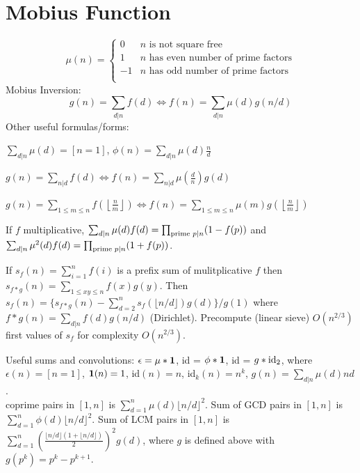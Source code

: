 \section{Mobius Function}
\[
	\mu(n) = \begin{cases} 0 & n \textrm{ is not square free}\\ 1 & n \textrm{ has even number of prime factors}\\ -1 & n \textrm{ has odd number of prime factors}\\\end{cases}
\]
  Mobius Inversion:
  \[ g(n) = \sum_{d|n} f(d) \Leftrightarrow f(n) = \sum_{d|n} \mu(d)g(n/d) \]
  Other useful formulas/forms:

  $ \sum_{d | n} \mu(d) = [ n = 1] $,
  $ \phi(n) = \sum_{d | n} \mu(d)\frac{n}{d}$

  $ g(n) = \sum_{n|d} f(d) \Leftrightarrow f(n) = \sum_{n|d} \mu(\frac{d}{n})g(d)$

  $ g(n) = \sum_{1 \leq m \leq n} f(\left\lfloor\frac{n}{m}\right \rfloor ) \Leftrightarrow f(n) = \sum_{1\leq m\leq n} \mu(m)g(\left\lfloor\frac{n}{m}\right\rfloor)$

  If $f$ multiplicative, $\sum_{d | n} \mu(d)f(d) = \prod_{\textnormal{prime } p | n}(1 - f(p))$ and $\sum_{d | n}\mu^2(d)f(d) = \prod_{\textnormal{prime } p | n} (1 + f(p))$. 

  If $s_f(n) = \sum_{i = 1}^{n} f(i)$ is a prefix sum of mulitplicative $f$ then $s_{f * g}(n) = \sum_{1 \leq xy \leq n}f(x)g(y)$. Then $s_f(n) = \{s_{f * g}(n) - \sum_{d = 2}^{n} s_f(\lfloor n / d \rfloor) g(d)\} / g(1)$ where $f * g(n) = \sum_{d | n} f(d)g(n / d)$ (Dirichlet). Precompute (linear sieve) $O(n^{2/3})$ first values of $s_f$ for complexity $O(n^{2/3})$.

  Useful sums and convolutions: $\epsilon = \mu * \textnormal{\textbf{1}}$, id = $\phi * \textnormal{\textbf{1}}$, id = $g * \textnormal{id}_2$, where $\epsilon(n) = [n = 1]$, $\textnormal{\textbf{1}}(n) = 1$, id$(n) = n$, id$_k(n) = n^k$, $g(n) = \sum_{d | n}\mu(d)nd$.\\
  coprime pairs in $[1,n]$ is $\sum_{d = 1}^{n}\mu(d)\lfloor n / d \rfloor ^2$. Sum of GCD pairs in $[1, n]$ is $\sum_{d = 1}^{n}\phi(d)\lfloor n / d \rfloor ^2$. Sum of LCM pairs in $[1, n]$ is $\sum_{d = 1}^{n}(\frac{\lfloor n / d \rfloor (1 + \lfloor n / d \rfloor)}{2})^2 g(d)$, where $g$ is defined above with $g(p^k) = p^k - p^{k+1}$.

